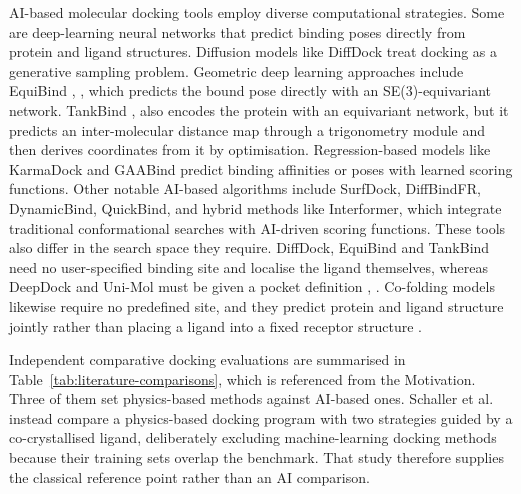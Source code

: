 AI-based molecular docking tools employ diverse computational strategies. Some are deep-learning neural networks that predict binding poses directly from protein and ligand structures. Diffusion models like DiffDock \cite{ref024} treat docking as a generative sampling problem. Geometric deep learning approaches include EquiBind \cite{ref009}, \cite{ref010}, which predicts the bound pose directly with an SE(3)-equivariant network. TankBind \cite{ref025}, \cite{ref026} also encodes the protein with an equivariant network, but it predicts an inter-molecular distance map through a trigonometry module and then derives coordinates from it by optimisation. Regression-based models like KarmaDock \cite{ref027} and GAABind \cite{ref028} predict binding affinities or poses with learned scoring functions. Other notable AI-based algorithms include SurfDock, DiffBindFR, DynamicBind, QuickBind, and hybrid methods like Interformer, which integrate traditional conformational searches with AI-driven scoring functions. These tools also differ in the search space they require. DiffDock, EquiBind and TankBind need no user-specified binding site and localise the ligand themselves, whereas DeepDock and Uni-Mol must be given a pocket definition \cite{ref012}, \cite{ref035}. Co-folding models likewise require no predefined site, and they predict protein and ligand structure jointly rather than placing a ligand into a fixed receptor structure \cite{ref012}.

Independent comparative docking evaluations are summarised in Table~\ref{tab:literature-comparisons}, which is referenced from the Motivation. Three of them set physics-based methods against AI-based ones. Schaller et al. instead compare a physics-based docking program with two strategies guided by a co-crystallised ligand, deliberately excluding machine-learning docking methods because their training sets overlap the benchmark. That study therefore supplies the classical reference point rather than an AI comparison.

